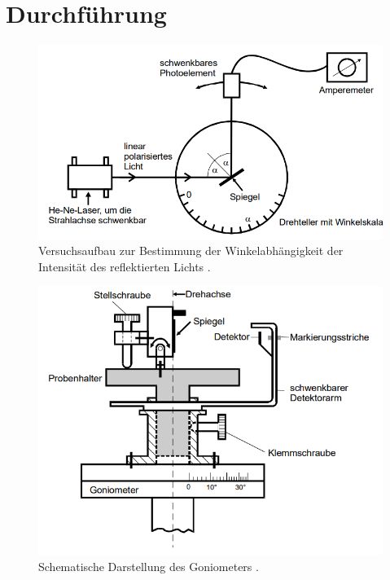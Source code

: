 \section{Durchführung}
\label{sec:Durchführung}
\begin{figure}[H]
    \centering
    \includegraphics[scale=1]{content/Aufbau.png}
    \caption{Versuchsaufbau zur Bestimmung der Winkelabhängigkeit der Intensität des reflektierten Lichts \cite{sample}.}
    \label{fig:Aufbau}
\end{figure}
\begin{figure}[H]
    \centering
    \includegraphics[scale=1]{content/Goniometer.png}
    \caption{Schematische Darstellung des Goniometers \cite{sample}.}
    \label{fig:Gonio}
\end{figure}
